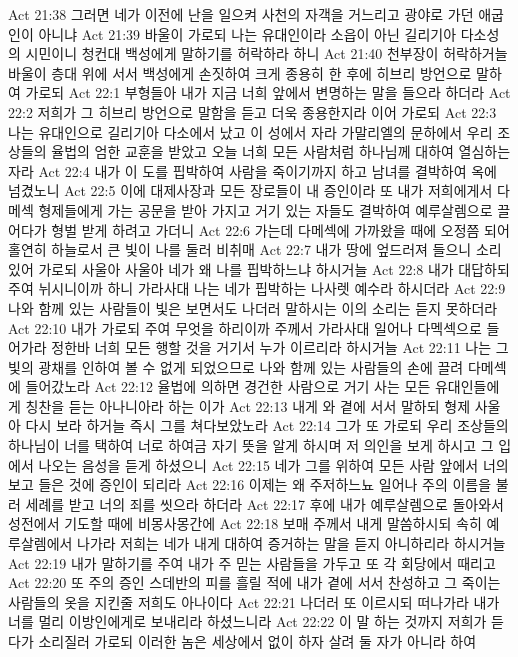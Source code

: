 Act 21:38  그러면 네가 이전에 난을 일으켜 사천의 자객을 거느리고 광야로 가던 애굽인이 아니냐
Act 21:39  바울이 가로되 나는 유대인이라 소읍이 아닌 길리기아 다소성의 시민이니 청컨대 백성에게 말하기를 허락하라 하니
Act 21:40  천부장이 허락하거늘 바울이 층대 위에 서서 백성에게 손짓하여 크게 종용히 한 후에 히브리 방언으로 말하여 가로되
Act 22:1  부형들아 내가 지금 너희 앞에서 변명하는 말을 들으라 하더라
Act 22:2  저희가 그 히브리 방언으로 말함을 듣고 더욱 종용한지라 이어 가로되
Act 22:3  나는 유대인으로 길리기아 다소에서 났고 이 성에서 자라 가말리엘의 문하에서 우리 조상들의 율법의 엄한 교훈을 받았고 오늘 너희 모든 사람처럼 하나님께 대하여 열심하는 자라
Act 22:4  내가 이 도를 핍박하여 사람을 죽이기까지 하고 남녀를 결박하여 옥에 넘겼노니
Act 22:5  이에 대제사장과 모든 장로들이 내 증인이라 또 내가 저희에게서 다메섹 형제들에게 가는 공문을 받아 가지고 거기 있는 자들도 결박하여 예루살렘으로 끌어다가 형벌 받게 하려고 가더니
Act 22:6  가는데 다메섹에 가까왔을 때에 오정쯤 되어 홀연히 하늘로서 큰 빛이 나를 둘러 비취매
Act 22:7  내가 땅에 엎드러져 들으니 소리 있어 가로되 사울아 사울아 네가 왜 나를 핍박하느냐 하시거늘
Act 22:8  내가 대답하되 주여 뉘시니이까 하니 가라사대 나는 네가 핍박하는 나사렛 예수라 하시더라
Act 22:9  나와 함께 있는 사람들이 빛은 보면서도 나더러 말하시는 이의 소리는 듣지 못하더라
Act 22:10  내가 가로되 주여 무엇을 하리이까 주께서 가라사대 일어나 다멕섹으로 들어가라 정한바 너희 모든 행할 것을 거기서 누가 이르리라 하시거늘
Act 22:11  나는 그 빛의 광채를 인하여 볼 수 없게 되었으므로 나와 함께 있는 사람들의 손에 끌려 다메섹에 들어갔노라
Act 22:12  율법에 의하면 경건한 사람으로 거기 사는 모든 유대인들에게 칭찬을 듣는 아나니아라 하는 이가
Act 22:13  내게 와 곁에 서서 말하되 형제 사울아 다시 보라 하거늘 즉시 그를 쳐다보았노라
Act 22:14  그가 또 가로되 우리 조상들의 하나님이 너를 택하여 너로 하여금 자기 뜻을 알게 하시며 저 의인을 보게 하시고 그 입에서 나오는 음성을 듣게 하셨으니
Act 22:15  네가 그를 위하여 모든 사람 앞에서 너의 보고 들은 것에 증인이 되리라
Act 22:16  이제는 왜 주저하느뇨 일어나 주의 이름을 불러 세례를 받고 너의 죄를 씻으라 하더라
Act 22:17  후에 내가 예루살렘으로 돌아와서 성전에서 기도할 때에 비몽사몽간에
Act 22:18  보매 주께서 내게 말씀하시되 속히 예루살렘에서 나가라 저희는 네가 내게 대하여 증거하는 말을 듣지 아니하리라 하시거늘
Act 22:19  내가 말하기를 주여 내가 주 믿는 사람들을 가두고 또 각 회당에서 때리고
Act 22:20  또 주의 증인 스데반의 피를 흘릴 적에 내가 곁에 서서 찬성하고 그 죽이는 사람들의 옷을 지킨줄 저희도 아나이다
Act 22:21  나더러 또 이르시되 떠나가라 내가 너를 멀리 이방인에게로 보내리라 하셨느니라
Act 22:22  이 말 하는 것까지 저희가 듣다가 소리질러 가로되 이러한 놈은 세상에서 없이 하자 살려 둘 자가 아니라 하여
